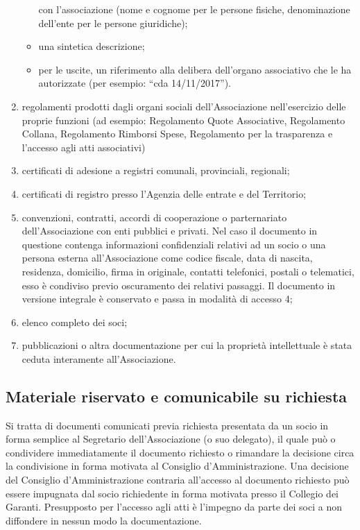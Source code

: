 \begin{enumerate}
\begin{itemize}
                con l'associazione (nome e cognome per le persone fisiche,
                denominazione dell'ente per le persone giuridiche);
            \item una sintetica descrizione;
            \item per le uscite, un riferimento alla delibera dell'organo
                associativo che le ha autorizzate (per esempio: ``cda
                14/11/2017'').
        \end{itemize}
    \item regolamenti prodotti dagli organi sociali dell’Associazione nell’esercizio delle proprie funzioni (ad esempio: Regolamento Quote Associative, Regolamento Collana, Regolamento Rimborsi Spese, Regolamento per la trasparenza e l’accesso agli atti associativi) 
    \item certificati di adesione a registri comunali, provinciali, regionali;
    \item certificati di registro presso l’Agenzia delle entrate e del Territorio;
    \item convenzioni, contratti, accordi di cooperazione o parternariato
        dell’Associazione con enti pubblici e privati. Nel caso il documento
        in questione contenga informazioni confidenziali relativi ad un
        socio o una persona esterna all’Associazione come codice fiscale,
        data di nascita, residenza, domicilio, firma in originale, contatti
        telefonici, postali o telematici, esso è condiviso previo
        oscuramento dei relativi passaggi. Il documento in versione
        integrale è conservato e passa in modalità di accesso 4; 
    \item elenco completo dei soci; 
    \item pubblicazioni o altra documentazione per cui la proprietà intellettuale è stata ceduta interamente all’Associazione.
\end{enumerate}

\subsection{Materiale riservato e comunicabile su
richiesta}\label{materiale-riservato-e-comunicabile-su-richiesta}

Si tratta di documenti comunicati previa richiesta presentata da un socio in forma semplice al Segretario dell’Associazione (o suo delegato), il quale può o condividere immediatamente il documento richiesto o rimandare la decisione circa la condivisione in forma motivata al Consiglio d’Amministrazione. Una decisione del Consiglio d’Amministrazione contraria all’accesso al documento richiesto può essere impugnata dal socio richiedente in forma motivata presso il Collegio dei Garanti. Presupposto per l’accesso agli atti è l’impegno da parte dei soci a non diffondere in nessun modo la documentazione.  

